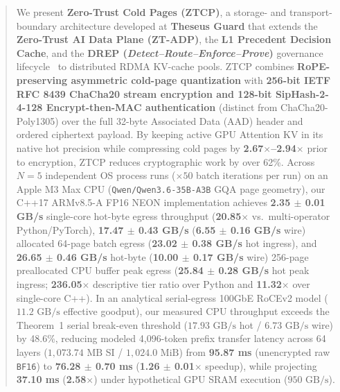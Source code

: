 \documentclass[10pt,twocolumn]{article}
\begin{document}
\begin{abstract}
We present \textbf{Zero-Trust Cold Pages (ZTCP)}, a storage- and transport-boundary architecture developed at \textbf{Theseus Guard} that extends the \textbf{Zero-Trust AI Data Plane (ZT-ADP)}, the \textbf{L1 Precedent Decision Cache}, and the \textbf{DREP (\textit{Detect--Route--Enforce--Prove})} governance lifecycle~\cite{theseusguard2026patent} to distributed RDMA KV-cache pools. ZTCP combines \textbf{RoPE-preserving asymmetric cold-page quantization} with \textbf{256-bit IETF RFC 8439 ChaCha20 stream encryption and 128-bit SipHash-2-4-128 Encrypt-then-MAC authentication} (distinct from ChaCha20-Poly1305) over the full 32-byte Associated Data (AAD) header and ordered ciphertext payload. By keeping active GPU Attention KV in its native hot precision while compressing cold pages by \textbf{2.67$\times$--2.94$\times$} prior to encryption, ZTCP reduces cryptographic work by over 62\%. Across $N=5$ independent OS process runs ($\times 50$ batch iterations per run) on an Apple M3 Max CPU (\texttt{Qwen/Qwen3.6-35B-A3B} GQA page geometry), our C++17 ARMv8.5-A FP16 NEON implementation achieves \textbf{2.35 $\pm$ 0.01 GB/s} single-core hot-byte egress throughput (\textbf{20.85$\times$} vs.\ multi-operator Python/PyTorch), \textbf{17.47 $\pm$ 0.43 GB/s} (\textbf{6.55 $\pm$ 0.16 GB/s} wire) allocated 64-page batch egress (\textbf{23.02 $\pm$ 0.38 GB/s} hot ingress), and \textbf{26.65 $\pm$ 0.46 GB/s} hot-byte (\textbf{10.00 $\pm$ 0.17 GB/s} wire) 256-page preallocated CPU buffer peak egress (\textbf{25.84 $\pm$ 0.28 GB/s} hot peak ingress; \textbf{236.05$\times$} descriptive tier ratio over Python and \textbf{11.32$\times$} over single-core C++). In an analytical serial-egress 100GbE RoCEv2 model ($11.2\text{ GB/s}$ effective goodput), our measured CPU throughput exceeds the Theorem~1 serial break-even threshold ($17.93\text{ GB/s}$ hot / $6.73\text{ GB/s}$ wire) by 48.6\%, reducing modeled 4,096-token prefix transfer latency across 64 layers ($1,073.74\text{ MB}$ SI / $1,024.0\text{ MiB}$) from \textbf{95.87 ms} (unencrypted raw \texttt{BF16}) to \textbf{76.28 $\pm$ 0.70 ms} (\textbf{1.26 $\pm$ 0.01$\times$} speedup), while projecting \textbf{37.10 ms} (\textbf{2.58$\times$}) under hypothetical GPU SRAM execution ($950\text{ GB/s}$).
\end{abstract}
\end{document}
